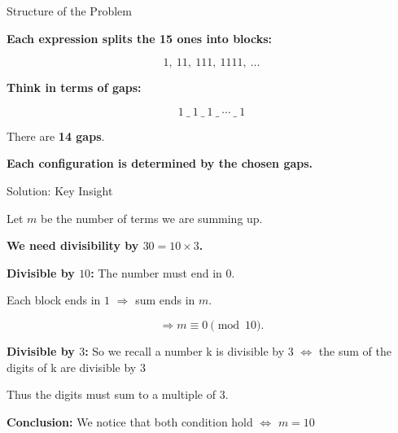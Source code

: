 \begin{frame}{Structure of the Problem}

\textbf{Each expression splits the 15 ones into blocks:}

\[
1,\ 11,\ 111,\ 1111,\ \dots
\]

\medskip

\textbf{Think in terms of gaps:}

\[
1 \ \_ \ 1 \ \_ \ 1 \ \_ \ \cdots \ \_ \ 1
\]

\medskip

There are \textbf{14 gaps}.

\medskip

\textbf{Each configuration is determined by the chosen gaps.}

\end{frame}




\begin{frame}{Solution: Key Insight}

Let $m$ be the number of terms we are summing up.

\medskip

\textbf{We need divisibility by $30 = 10 \times 3$.}

\medskip

\textbf{Divisible by $10$:}
The number must end in $0$.

\medskip

Each block ends in $1$ $\Rightarrow$ sum ends in $m$.

\[
\Rightarrow m \equiv 0 \pmod{10}.
\]

\medskip

\textbf{Divisible by $3$:}
So we recall a number k is divisible by 3 $\iff$ the sum of the digits of k are divisible by 3

Thus the digits must sum to a multiple of $3$.


\medskip

\textbf{Conclusion:} We notice that both condition hold $\iff$ $m=10$

\end{frame}

